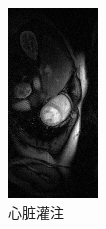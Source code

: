 \documentclass{beamer}
\begin{document}
\begin{frame}
\begin{figure}[htbp]
\begin{minipage}[t]{0.165\textwidth}
\includegraphics[width=\textwidth]{../img/intro/perfusion.png}
\\心脏灌注
\end{minipage}

\end{figure}
\end{frame}
\end{document}
